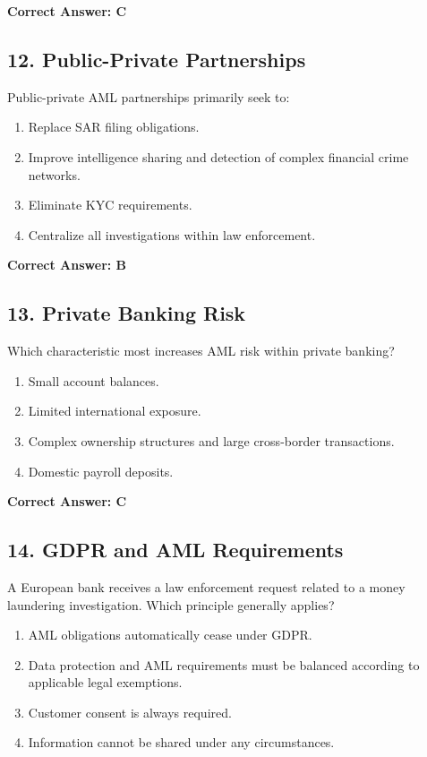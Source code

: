 \documentclass[11pt,a4paper]{article}
\begin{document}
	\textbf{Correct Answer: C}
	
	\subsection{12. Public-Private Partnerships}
	
	Public-private AML partnerships primarily seek to:
	
	\begin{enumerate}[label=\Alph*.]
		\item Replace SAR filing obligations.
		\item Improve intelligence sharing and detection of complex financial crime networks.
		\item Eliminate KYC requirements.
		\item Centralize all investigations within law enforcement.
	\end{enumerate}
	
	\textbf{Correct Answer: B}
	
	\subsection{13. Private Banking Risk}
	
	Which characteristic most increases AML risk within private banking?
	
	\begin{enumerate}[label=\Alph*.]
		\item Small account balances.
		\item Limited international exposure.
		\item Complex ownership structures and large cross-border transactions.
		\item Domestic payroll deposits.
	\end{enumerate}
	
	\textbf{Correct Answer: C}
	
	\subsection{14. GDPR and AML Requirements}
	
	A European bank receives a law enforcement request related to a money laundering investigation. Which principle generally applies?
	
	\begin{enumerate}[label=\Alph*.]
		\item AML obligations automatically cease under GDPR.
		\item Data protection and AML requirements must be balanced according to applicable legal exemptions.
		\item Customer consent is always required.
		\item Information cannot be shared under any circumstances.
	\end{enumerate}
	
\end{document}

